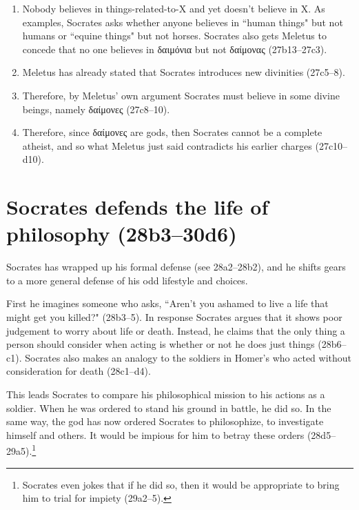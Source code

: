 \documentclass[11pt]{article}
\begin{document}
\begin{enumerate}
    \item Nobody believes in things-related-to-X and yet doesn't believe in X.  As examples, Socrates asks whether anyone believes in ``human things" but not humans or ``equine things" but not horses.  Socrates also gets Meletus to concede that no one believes in δαιμόνια but not δαίμονας (27b13--27c3).
    \item Meletus has already stated that Socrates introduces new divinities (27c5--8).
    \item Therefore, by Meletus' own argument Socrates must believe in some divine beings, namely δαίμονες (27c8--10).
    \item Therefore, since δαίμονες are gods, then Socrates cannot be a complete atheist, and so what Meletus just said contradicts his earlier charges (27c10--d10).
\end{enumerate}


\section{Socrates defends the life of philosophy (28b3--30d6)}

Socrates has wrapped up his formal defense (see 28a2--28b2), and he shifts gears to a more general defense of his odd lifestyle and choices.

First he imagines someone who asks, ``Aren't you ashamed to live a life that might get you killed?" (28b3--5).  In response Socrates argues that it shows poor judgement to worry about life or death. Instead, he claims that the only thing a person should consider when acting is whether or not he does just things (28b6--c1).  Socrates also makes an analogy to the soldiers in Homer's  who acted without consideration for death (28c1--d4).

This leads Socrates to compare his philosophical mission to his actions as a soldier.  When he was ordered to stand his ground in battle, he did so.  In the same way, the god has now ordered Socrates to philosophize, to investigate himself and others.  It would be impious for him to betray these orders (28d5--29a5).\footnote{Socrates even jokes that if he did so, then it would be appropriate to bring him to trial for impiety (29a2--5).}
\end{document}
